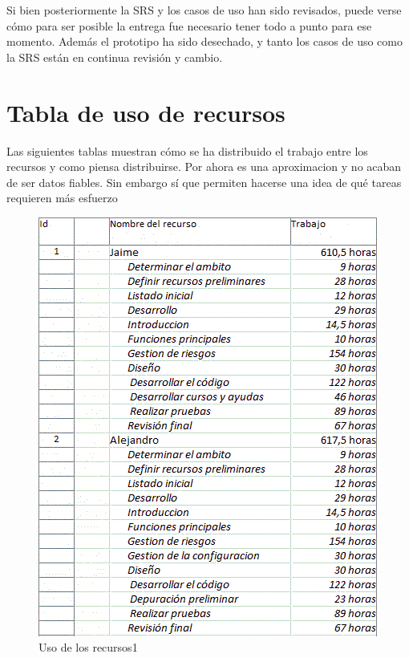 \documentclass[spanish,a4paper,12pt]{report}	%
\begin{document}
	 Si bien posteriormente la SRS y los casos de uso han sido revisados, puede verse cómo para ser posible la entrega fue necesario tener todo a punto para ese momento.
	Además el prototipo ha sido desechado, y tanto los casos de uso como la SRS están en continua revisión y cambio.
	

	\newpage

	\section{Tabla de uso de recursos}
	
	Las siguientes tablas muestran cómo se ha distribuido el trabajo entre los recursos y como piensa distribuirse.
	Por ahora es una aproximacion y no acaban de ser datos fiables. Sin embargo sí que permiten hacerse una idea de qué tareas requieren más esfuerzo
	\begin{figure}[!h]
	\centering
	\includegraphics[scale=0.8]{UsoRecursos1.png}
	\caption{Uso de los recursos1}
	\end{figure}
\end{document}

